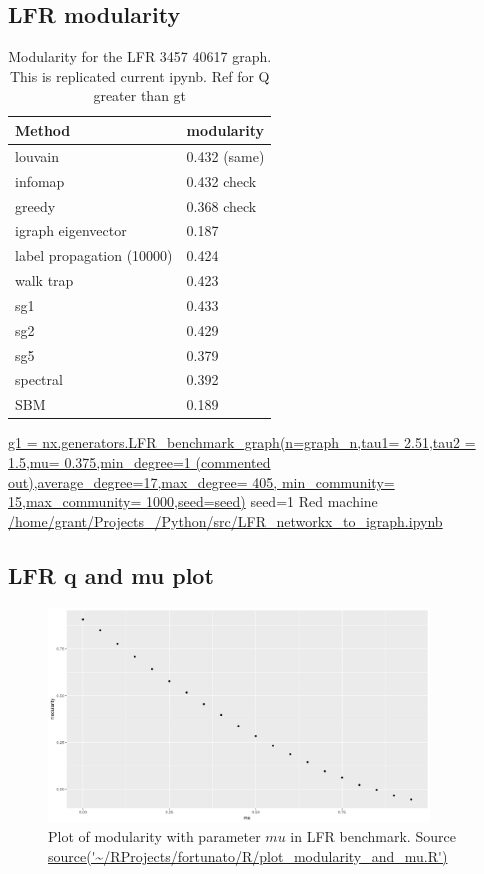 \subsection{LFR modularity}
\begin{table}[]
    \centering
    \begin{tabular}{ll}
    \toprule
    Method & modularity \\
    \midrule
        louvain & 0.432 (same) \\
infomap & 0.432   check\\
 greedy & 0.368 check\\
igraph eigenvector & 0.187\\
label propagation (10000) & 0.424 \\
walk trap  & 0.423 \\
sg1  & 0.433 \\
sg2 & 0.429 \\
sg5 & 0.379 \\
 spectral & 0.392\\
SBM & 0.189  \\
\bottomrule
         
    \end{tabular}
    \caption{Modularity for the LFR 3457 40617 graph. This is replicated current ipynb. Ref for Q greater than gt \cite{danon2006effect} }
    \tiny\url{g1 = nx.generators.LFR_benchmark_graph(n=graph_n,tau1= 2.51,tau2 = 1.5,mu= 0.375,min_degree=1 (commented out),average_degree=17,max_degree= 405, min_community= 15,max_community= 1000,seed=seed)} seed=1
    \tiny Red machine
    \tiny\url{/home/grant/Projects_/Python/src/LFR_networkx_to_igraph.ipynb}
    \label{tab:modularity for the LFR 3457 40617 graph}
\end{table}

\subsection{LFR q and mu plot}

\begin{figure}
    \centering
    \includegraphics[width=0.9\textwidth]{images/Rplot_modularity_and_mu_series.png}
    \caption{Plot of modularity with parameter $mu$ in LFR benchmark. Source \url{source('~/RProjects/fortunato/R/plot_modularity_and_mu.R')}}
    \label{fig:modularity_and_mu}
\end{figure}

